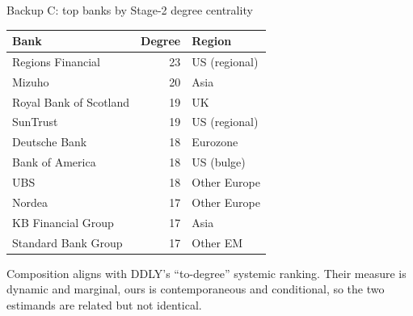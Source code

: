 \begin{frame}[t]{Backup C: top banks by Stage-2 degree centrality}
    \footnotesize
    \begin{table}[H]
        \centering
        \begin{tabular}{l r l}
            \toprule
            Bank & Degree & Region \\
            \midrule
            Regions Financial      & 23 & US (regional) \\
            Mizuho                 & 20 & Asia \\
            Royal Bank of Scotland & 19 & UK \\
            SunTrust               & 19 & US (regional) \\
            Deutsche Bank          & 18 & Eurozone \\
            Bank of America        & 18 & US (bulge) \\
            UBS                    & 18 & Other Europe \\
            Nordea                 & 17 & Other Europe \\
            KB Financial Group     & 17 & Asia \\
            Standard Bank Group    & 17 & Other EM \\
            \bottomrule
        \end{tabular}
    \end{table}
    \vfill
    Composition aligns with DDLY's ``to-degree'' systemic ranking. Their measure is dynamic and marginal, ours is contemporaneous and conditional, so the two estimands are related but not identical.
\end{frame}

